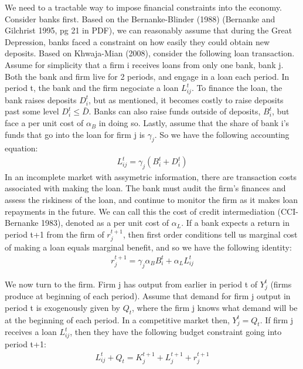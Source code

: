 \documentclass[letter,11pt]{article}
\begin{document}
{We need to a tractable way to impose financial constraints into the economy. Consider banks first. Based on the Bernanke-Blinder (1988) (Bernanke and Gilchrist 1995, pg 21 in PDF), we can reasonably assume that during the Great Depression, banks faced a constraint on how easily they could obtain new deposits. Based on Khwaja-Mian (2008), consider the following loan transaction. Assume for simplicity that a firm i receives loans from only one bank, bank j. Both the bank and firm live for 2 periods, and engage in a loan each period. In period t, the bank and the firm negociate a loan $L_{ij}^t$. To finance the loan, the bank raises deposits $D_i^t$, but as mentioned, it becomes costly to raise deposits past some level $D_i^t \leq \bar{D}$. Banks can also raise funds outside of deposits, $B_i^t$, but face a per unit cost of $\alpha_B$ in doing so. Lastly, assume that the share of bank i's funds that go into the loan for firm j is $\gamma_j$. So we have the following accounting equation:
\begin{align*}
L_{ij}^t = \gamma_j (B_i^t + D_i^t)
\end{align*}
In an incomplete market with assymetric information, there are transaction costs associated with making the loan. The bank must audit the firm's finances and assess the riskiness of the loan, and continue to monitor the firm as it makes loan repayments in the future. We can call this the cost of credit intermediation (CCI-Bernanke 1983), denoted as a per unit cost of $\alpha_L$. If a bank expects a return in period t+1 from the firm of $r_j^{t+1}$, then first order conditions tell us marginal cost of making a loan equals marginal benefit, and so we have the following identity:
\begin{align*}
r_j^{t+1} = \gamma_j \alpha_B B_i^t + \alpha_L L_{ij}^t
\end{align*}

We now turn to the firm. \iffalse The firm has two sources of funding -- loans from bank j, $L_{ij}^t$, and external financing, $E_{ij}^t$. External financing requires connections with other investors, and higher levels of collateral. So suppose only large firms are able to find external financing, and then access to external financing by firm j is given by $\mathds{1}_{Large firm} E_{ij}^t$. \fi Firm j has output from earlier in period t of $Y_j^t$ (firms produce at beginning of each period). Assume that demand for firm j output in period t is exogenously given by $Q_t$, where the firm j knows what demand will be at the beginning of each period. In a competitive market then, $Y_j^t = Q_t$. If firm j receives a loan $L_{ij}^t$, then they have the following budget constraint going into period t+1:
\begin{align*}
L_{ij}^t + \iffalse \mathds{1}_{Large firm} E_{ij}^t +\fi Q_t = K_j^{t+1} + L_j^{t+1} + r_j^{t+1}
\end{align*}

}
\end{document}
